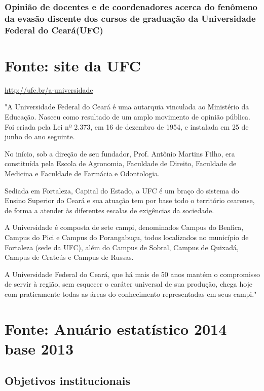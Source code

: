 \documentclass{report}
\begin{document}
\subsubsection{Opinião de docentes e de coordenadores acerca do fenômeno da evasão discente dos cursos de graduação da Universidade Federal do Ceará(UFC)}


\section{Fonte: site da UFC}

\url{http://ufc.br/a-universidade}

"A Universidade Federal do Ceará é uma autarquia vinculada ao Ministério da Educação. Nasceu como resultado de um amplo movimento de opinião pública. Foi criada pela Lei nº 2.373, em 16 de dezembro de 1954, e instalada em 25 de junho do ano seguinte.

No início, sob a direção de seu fundador, Prof. Antônio Martins Filho, era constituída pela Escola de Agronomia, Faculdade de Direito, Faculdade de Medicina e Faculdade de Farmácia e Odontologia.

Sediada em Fortaleza, Capital do Estado, a UFC é um braço do sistema do Ensino Superior do Ceará e sua atuação tem por base todo o território cearense, de forma a atender às diferentes escalas de exigências da sociedade.

A Universidade é composta de sete campi, denominados Campus do Benfica, Campus do Pici e Campus do Porangabuçu, todos localizados no município de Fortaleza (sede da UFC), além do Campus de Sobral, Campus de Quixadá, Campus de Crateús e Campus de Russas.

A Universidade Federal do Ceará, que há mais de 50 anos mantém o compromisso de servir à região, sem esquecer o caráter universal de sua produção, chega hoje com praticamente todas as áreas do conhecimento representadas em seus campi." 

\section{Fonte: Anuário estatístico 2014 base 2013}

\cite{anuario_2014_base_2013}

\subsection{Objetivos institucionais}
\end{document}
